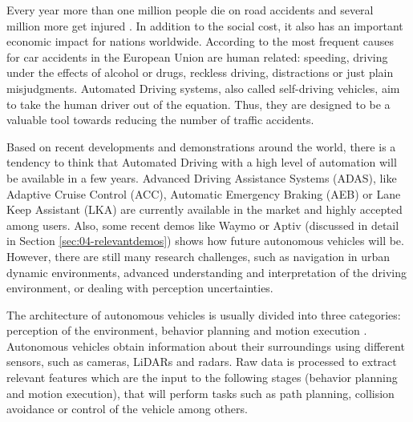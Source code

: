 Every year more than one million people die on road accidents and several 
million more get injured \cite{world2015global}. In addition to the social cost, it also has an
important economic impact for nations worldwide. According to 
\cite{Thomas2013} the most frequent causes for car accidents in the
European Union are human related: speeding, driving under the effects of
alcohol or drugs, reckless driving, distractions or just plain misjudgments.
Automated Driving systems, also called self-driving vehicles, aim to take the 
human driver out of the equation. Thus, they are designed to be a valuable tool
towards reducing the number of traffic accidents.

Based on recent developments and demonstrations around the world, there is a 
tendency to think that Automated Driving with a high level of automation will 
be available in a few years. 
Advanced Driving Assistance Systems (ADAS), like Adaptive Cruise Control 
(ACC), Automatic Emergency Braking (AEB) or Lane Keep Assistant (LKA) are
currently available in the market \cite{Bengler2014} and highly accepted among
users. 
Also, some recent demos like Waymo or Aptiv (discussed in detail in Section
\ref{sec:04-relevantdemos}) shows how future autonomous vehicles will be.
However, there are still many research challenges, such as navigation in urban 
dynamic environments, advanced understanding and interpretation of the driving 
environment, or dealing with perception uncertainties.
%

The architecture of autonomous vehicles is usually divided into three 
categories: perception of the environment, behavior planning and motion 
execution \cite{behere2015functional}. Autonomous 
vehicles obtain information about their surroundings using different
sensors, such as cameras, LiDARs and radars. Raw data is processed to extract
relevant features which are the input to the following stages (behavior
planning and motion execution), that will perform tasks such as path planning,
collision avoidance or control of the vehicle among others. 

